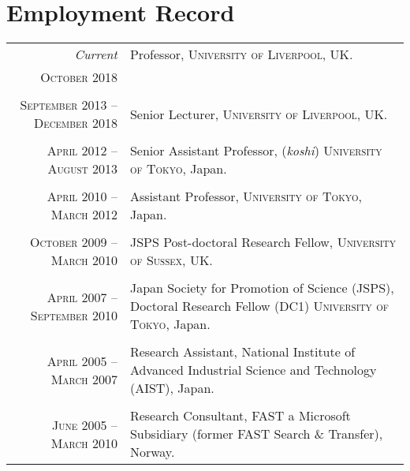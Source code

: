 \documentclass[a4paper,11pt]{article}
\begin{document}
\section{Employment Record}
\begin{tabular}{r|p{11cm}}
 \emph{Current} & Professor, \textsc{University of Liverpool}, UK. \\\textsc{October 2018} \\\multicolumn{2}{c}{} \\
 \textsc{September 2013 -- December 2018} & Senior Lecturer, \textsc{University of Liverpool}, UK.  \\\multicolumn{2}{c}{} \\
 \textsc{April 2012 -- August 2013} & Senior Assistant Professor, (\emph{koshi})  \textsc{University of Tokyo}, Japan. \\\multicolumn{2}{c}{} \\
\textsc{April 2010 -- March 2012} & Assistant Professor, \textsc{University of Tokyo}, Japan. \\\multicolumn{2}{c}{} \\
\textsc{October 2009 -- March 2010} & JSPS Post-doctoral Research Fellow, \textsc{University of Sussex}, UK. \\\multicolumn{2}{c}{} \\
\textsc{April 2007 -- September 2010} & Japan Society for Promotion of Science (JSPS), Doctoral Research Fellow (DC1) \textsc{University of Tokyo}, Japan. \\\multicolumn{2}{c}{} \\
\textsc{April 2005 -- March 2007} & Research Assistant, \textsf{National Institute of Advanced Industrial Science and Technology} (AIST), Japan. \\\multicolumn{2}{c}{} \\
\textsc{June 2005 -- March 2010} & Research Consultant, \textsf{FAST a Microsoft Subsidiary} (former FAST Search \& Transfer), Norway.
\end{tabular}

%
\end{document}
